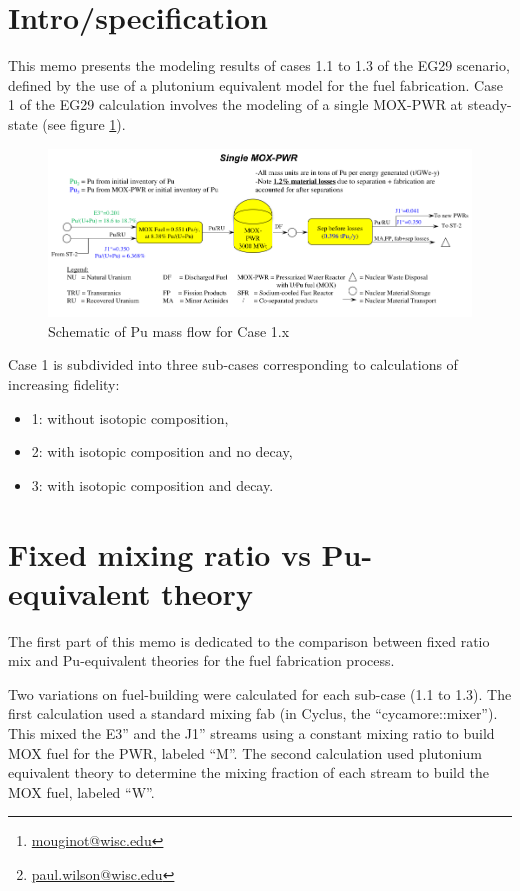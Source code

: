 \documentclass[12pt]{article}
\title{}
\author[1]{B. Mouginot  \thanks{\href{mailto:mouginot@wisc.edu}{mouginot@wisc.edu}}}
\author[1]{P.P.H. Wilson\thanks{\href{mailto:paul.wilson@wisc.edu}{paul.wilson@wisc.edu}}}
\author[1]{R. Carlsen}
\author[1]{A. Opotowsky}
\affil[1]{University of Wisconsin--Madison, Department of Engineering Physics, CNERG group}
\date{\today}
\begin{document}
\maketitle

\section{Intro/specification}

This memo presents the modeling results of cases 1.1 to 1.3 of the EG29
scenario, defined by the use of a plutonium equivalent model for the fuel
fabrication. Case 1 of the EG29 calculation involves the modeling of a single
MOX-PWR at steady-state (see figure \ref{fig:puflow}).

\begin{figure}[h!]
  \centering
  \includegraphics[width=1\textwidth]  {img/puflow}
  \caption{Schematic of Pu mass flow for Case 1.x}
  \label{fig:puflow}
\end{figure}

Case 1 is subdivided into three sub-cases corresponding to calculations of
increasing fidelity: 
\begin{itemize}
  \item	1: without isotopic composition, 
  \item 2: with isotopic composition and no decay,
  \item 3: with isotopic composition and decay.
\end{itemize}


\section{Fixed mixing ratio vs Pu-equivalent theory}

The first part of this memo is dedicated to the comparison between fixed ratio
mix and Pu-equivalent theories for the fuel fabrication process.

Two variations on fuel-building were calculated for each sub-case (1.1 to 1.3).
The first calculation used a standard mixing fab (in Cyclus, the
``cycamore::mixer''). This mixed the E3” and the J1” streams using a constant mixing
ratio to build MOX fuel for the PWR, labeled “M”. The second calculation
used plutonium equivalent theory to determine the mixing fraction of each stream
to build the MOX fuel, labeled “W”.
\end{document}
